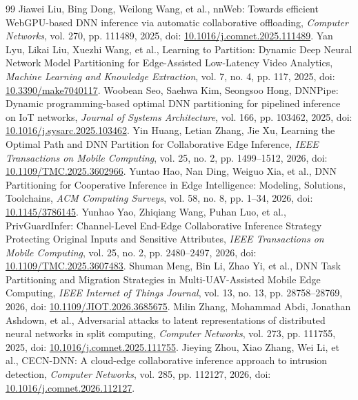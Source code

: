 \documentclass[10pt,a4paper,twocolumn]{article}
\begin{document}
\begin{thebibliography}{99}
 Jiawei Liu, Bing Dong, Weilong Wang, et al., nnWeb: Towards efficient WebGPU-based DNN inference via automatic collaborative offloading, \emph{Computer Networks}, vol. 270, pp. 111489, 2025, doi: \href{https://doi.org/10.1016/j.comnet.2025.111489}{10.1016/j.comnet.2025.111489}.
 Yan Lyu, Likai Liu, Xuezhi Wang, et al., Learning to Partition: Dynamic Deep Neural Network Model Partitioning for Edge-Assisted Low-Latency Video Analytics, \emph{Machine Learning and Knowledge Extraction}, vol. 7, no. 4, pp. 117, 2025, doi: \href{https://doi.org/10.3390/make7040117}{10.3390/make7040117}.
 Woobean Seo, Saehwa Kim, Seongsoo Hong, DNNPipe: Dynamic programming-based optimal DNN partitioning for pipelined inference on IoT networks, \emph{Journal of Systems Architecture}, vol. 166, pp. 103462, 2025, doi: \href{https://doi.org/10.1016/j.sysarc.2025.103462}{10.1016/j.sysarc.2025.103462}.
 Yin Huang, Letian Zhang, Jie Xu, Learning the Optimal Path and DNN Partition for Collaborative Edge Inference, \emph{IEEE Transactions on Mobile Computing}, vol. 25, no. 2, pp. 1499--1512, 2026, doi: \href{https://doi.org/10.1109/TMC.2025.3602966}{10.1109/TMC.2025.3602966}.
 Yuntao Hao, Nan Ding, Weiguo Xia, et al., DNN Partitioning for Cooperative Inference in Edge Intelligence: Modeling, Solutions, Toolchains, \emph{ACM Computing Surveys}, vol. 58, no. 8, pp. 1--34, 2026, doi: \href{https://doi.org/10.1145/3786145}{10.1145/3786145}.
 Yunhao Yao, Zhiqiang Wang, Puhan Luo, et al., PrivGuardInfer: Channel-Level End-Edge Collaborative Inference Strategy Protecting Original Inputs and Sensitive Attributes, \emph{IEEE Transactions on Mobile Computing}, vol. 25, no. 2, pp. 2480--2497, 2026, doi: \href{https://doi.org/10.1109/TMC.2025.3607483}{10.1109/TMC.2025.3607483}.
 Shuman Meng, Bin Li, Zhao Yi, et al., DNN Task Partitioning and Migration Strategies in Multi-UAV-Assisted Mobile Edge Computing, \emph{IEEE Internet of Things Journal}, vol. 13, no. 13, pp. 28758--28769, 2026, doi: \href{https://doi.org/10.1109/JIOT.2026.3685675}{10.1109/JIOT.2026.3685675}.
 Milin Zhang, Mohammad Abdi, Jonathan Ashdown, et al., Adversarial attacks to latent representations of distributed neural networks in split computing, \emph{Computer Networks}, vol. 273, pp. 111755, 2025, doi: \href{https://doi.org/10.1016/j.comnet.2025.111755}{10.1016/j.comnet.2025.111755}.
 Jieying Zhou, Xiao Zhang, Wei Li, et al., CECN-DNN: A cloud-edge collaborative inference approach to intrusion detection, \emph{Computer Networks}, vol. 285, pp. 112127, 2026, doi: \href{https://doi.org/10.1016/j.comnet.2026.112127}{10.1016/j.comnet.2026.112127}.

\end{thebibliography}
\end{document}
